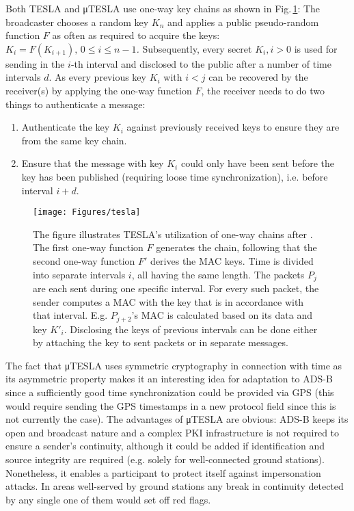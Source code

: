\documentclass[english]{IEEEtran}
\begin{document}
Both TESLA and μTESLA use one-way key chains as shown in Fig.\,\ref{fig:TESLA}:\emph{
}The broadcaster chooses a random key $K_{n}$ and applies a public
pseudo-random function $F$\emph{ }as often as required to acquire
the keys: \emph{$K_{i}=F(K_{i+1}),\,0\leq i\leq n-1$.} Subsequently,
every secret $K_{i},i>0$ is used for sending in the $i$-th interval
and disclosed to the public after a number of time intervals $d$.
As every previous key $K_{i}$ with $i<j$ can be recovered by the
receiver(s) by applying the one-way function $F$, the receiver needs
to do two things to authenticate a message: \cite{Liu}
\begin{enumerate}
\item Authenticate the key $K_{i}$ against previously received keys to
ensure they are from the same key chain.
\item Ensure that the message with key $K_{i}$ could only have been sent
before the key has been published (requiring loose time synchronization),
i.e. before interval $i+d$.
\end{enumerate}
\begin{figure}
\texttt{[image: Figures/tesla]}

\caption{The figure illustrates TESLA's utilization of one-way chains after
\cite{Perrig2005}. The first one-way function $F$ generates the
chain, following that the second one-way function $F'$ derives the
MAC keys. Time is divided into separate intervals $i$, all having
the same length. The packets $P_{j}$ are each sent during one specific
interval. For every such packet, the sender computes a MAC with the
key that is in accordance with that interval. E.g.\emph{ $P_{j+2}$}'s
MAC is calculated based on its data and key $K'_{i}$. Disclosing
the keys of previous intervals can be done either by attaching the
key to sent packets or in separate messages. \label{fig:TESLA}}


\end{figure}


The fact that μTESLA uses symmetric cryptography in connection with
time as its asymmetric property makes it an interesting idea for adaptation
to ADS-B since a sufficiently good time synchronization could be provided
via GPS (this would require sending the GPS timestamps in a new protocol
field since this is not currently the case). The advantages of μTESLA
are obvious: ADS-B keeps its open and broadcast nature and a complex
PKI infrastructure is not required to ensure a sender's continuity,
although it could be added if identification and source integrity
are required (e.g. solely for well-connected ground stations). Nonetheless,
it enables a participant to protect itself against impersonation attacks.
In areas well-served by ground stations any break in continuity detected
by any single one of them would set off red flags.
\end{document}
